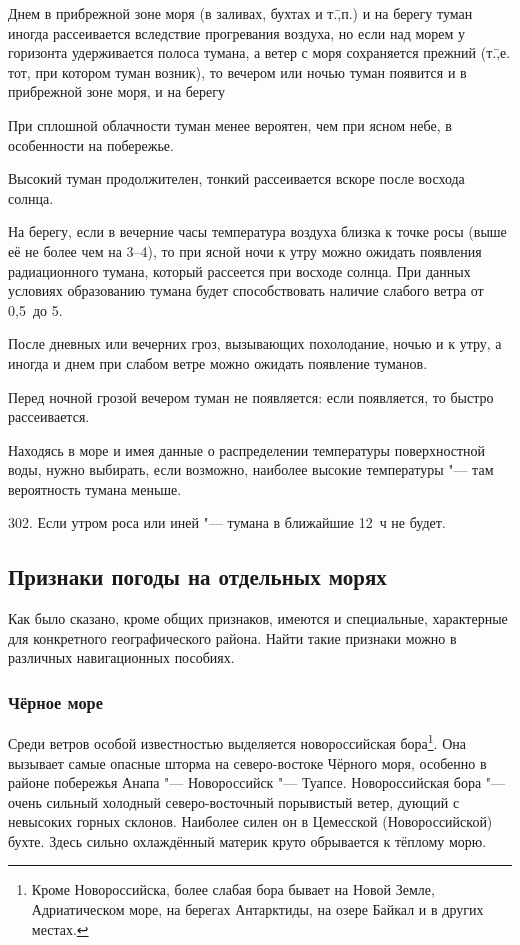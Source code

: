  Днем в прибрежной зоне моря (в заливах, бухтах и т.\=,п.) и на
берегу туман иногда рассеивается вследствие прогревания воздуха, но
если над морем у горизонта удерживается полоса тумана, а ветер с моря
сохраняется прежний (т.\=,е. тот, при котором туман возник), то
вечером или ночью туман появится и в прибрежной зоне моря, и на берегу

 При сплошной облачности туман менее вероятен, чем при ясном
небе, в особенности на побережье.

 Высокий туман продолжителен, тонкий рассеивается вскоре после
восхода солнца.

 На берегу, если в вечерние часы температура воздуха близка к
точке росы (выше её не более чем на 3--4\grC), то при ясной ночи к утру
можно ожидать появления радиационного тумана, который рассеется при
восходе солнца. При данных условиях образованию тумана будет
способствовать наличие слабого ветра от 0,5~до 5\speedms.

 После дневных или вечерних гроз, вызывающих похолодание, ночью
и к утру, а иногда и днем при слабом ветре можно ожидать появление
туманов.

 Перед ночной грозой вечером туман не появляется: если появляется,
то быстро рассеивается.

 Находясь в море и имея данные о распределении температуры
поверхностной воды, нужно выбирать, если возможно, наиболее высокие
температуры "--- там вероятность тумана меньше.

302. Если утром роса или иней "--- тумана в ближайшие 12~ч не будет.

\subsection{Признаки погоды на отдельных морях}

Как было сказано, кроме общих признаков, имеются и специальные,
характерные для конкретного географического района. Найти такие
признаки можно в различных навигационных пособиях.

\subsubsection{Чёрное море}

Среди ветров особой известностью выделяется новороссийская
бора\footnote{Кроме Новороссийска, более слабая бора бывает на Новой
  Земле, Адриатическом море, на берегах Антарктиды, на озере Байкал и
  в других местах.}. Она вызывает самые опасные шторма на
северо-востоке Чёрного моря, особенно в районе побережья Анапа "---
Новороссийск "--- Туапсе. Новороссийская бора "--- очень сильный
холодный северо-восточный порывистый ветер, дующий с невысоких горных
склонов. Наиболее силен он в Цемесской (Новороссийской) бухте. Здесь
сильно охлаждённый материк круто обрывается к тёплому морю.

